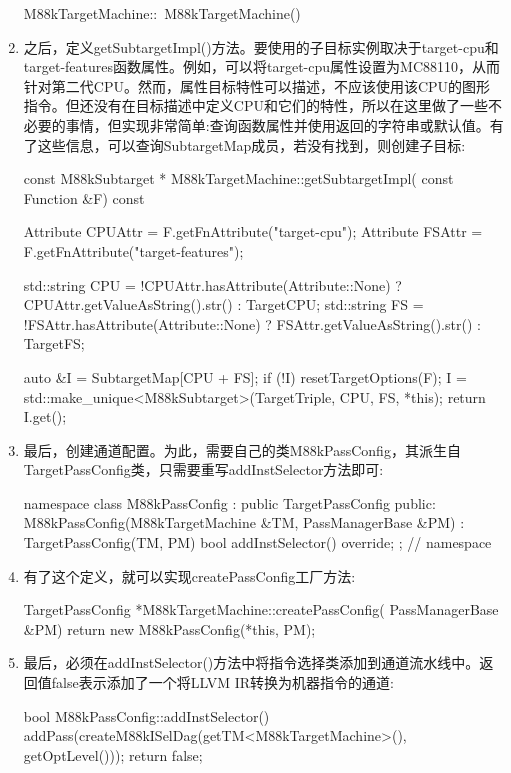 \begin{enumerate}
\begin{cpp}
M88kTargetMachine::~M88kTargetMachine() {}
\end{cpp}

\item
之后，定义getSubtargetImpl()方法。要使用的子目标实例取决于target-cpu和target-features函数属性。例如，可以将target-cpu属性设置为MC88110，从而针对第二代CPU。然而，属性目标特性可以描述，不应该使用该CPU的图形指令。但还没有在目标描述中定义CPU和它们的特性，所以在这里做了一些不必要的事情，但实现非常简单:查询函数属性并使用返回的字符串或默认值。有了这些信息，可以查询SubtargetMap成员，若没有找到，则创建子目标:

\begin{cpp}
const M88kSubtarget *
M88kTargetMachine::getSubtargetImpl(
        const Function &F) const {
    Attribute CPUAttr = F.getFnAttribute("target-cpu");
    Attribute FSAttr =
        F.getFnAttribute("target-features");

    std::string CPU =
        !CPUAttr.hasAttribute(Attribute::None)
            ? CPUAttr.getValueAsString().str()
            : TargetCPU;
    std::string FS = !FSAttr.hasAttribute(Attribute::None)
                        ? FSAttr.getValueAsString().str()
                        : TargetFS;

    auto &I = SubtargetMap[CPU + FS];
    if (!I) {
        resetTargetOptions(F);
        I = std::make_unique<M88kSubtarget>(TargetTriple,
                                            CPU, FS, *this);
    }
    return I.get();
}
\end{cpp}

\item
最后，创建通道配置。为此，需要自己的类M88kPassConfig，其派生自TargetPassConfig类，只需要重写addInstSelector方法即可:

\begin{cpp}
namespace {
class M88kPassConfig : public TargetPassConfig {
    public:
    M88kPassConfig(M88kTargetMachine &TM,
                   PassManagerBase &PM)
        : TargetPassConfig(TM, PM) {}
    bool addInstSelector() override;
};
} // namespace
\end{cpp}

\item
有了这个定义，就可以实现createPassConfig工厂方法:

\begin{cpp}
TargetPassConfig *M88kTargetMachine::createPassConfig(
        PassManagerBase &PM) {
    return new M88kPassConfig(*this, PM);
}
\end{cpp}

\item
最后，必须在addInstSelector()方法中将指令选择类添加到通道流水线中。返回值false表示添加了一个将LLVM IR转换为机器指令的通道:

\begin{cpp}
bool M88kPassConfig::addInstSelector() {
        addPass(createM88kISelDag(getTM<M88kTargetMachine>(),
                                  getOptLevel()));
    return false;
}
\end{cpp}
\end{enumerate}

